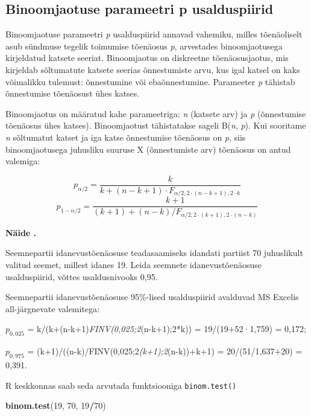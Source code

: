\documentclass[
]{book}
\newenvironment{Shaded}{\begin{snugshade}}{\end{snugshade}}
\newcommand{\DecValTok}[1]{\textcolor[rgb]{0.00,0.00,0.81}{#1}}
\newcommand{\FunctionTok}[1]{\textcolor[rgb]{0.13,0.29,0.53}{\textbf{#1}}}
\newcommand{\NormalTok}[1]{#1}
\newcommand{\SpecialCharTok}[1]{\textcolor[rgb]{0.81,0.36,0.00}{\textbf{#1}}}
\newcounter{naidis}[chapter]
\newenvironment{naidis}
{%
\definecolor{shadecolor}{rgb}{200, 200, 0}
\par\parindent 0pt
\begin{framed}
\begin{naitefont}
\refstepcounter{naidis}\textbf{Näide \thenaidis.}
}
{%
\end{naitefont}%
\end{framed}
}%
\renewenvironment{Shaded} {\begin{snugshade}\footnotesize} {\end{snugshade}}
\theoremstyle{definition}
\theoremstyle{definition}
\theoremstyle{definition}
\theoremstyle{definition}
\theoremstyle{remark}
\begin{document}
\subsection{Binoomjaotuse parameetri p usalduspiirid}\label{binoomjaotuse-parameetri-p-usalduspiirid}

Binoomjaotuse parameetri \emph{p} usalduspiirid annavad vahemiku, milles tõenäoliselt asub sündmuse tegelik toimumise tõenäosus \emph{p}, arvestades binoomjaotusega kirjeldatud katsete seeriat. Binoomjaotus on diskreetne tõenäosusjaotus, mis kirjeldab sõltumatute katsete seerias õnnestumiste arvu, kus igal katsel on kaks võimalikku tulemust: õnnestumine või ebaõnnestumine. Parameeter \emph{p} tähistab õnnestumise tõenäosust ühes katses.

Binoomjaotus on määratud kahe parameetriga: \emph{n} (katsete arv) ja \emph{p} (õnnestumise tõenäosus ühes katses). Binoomjaotust tähistatakse sageli B(\emph{n}, \emph{p}). Kui sooritame \emph{n} sõltumatut katset ja iga katse õnnestumise tõenäosus on \emph{p}, siis binoomjaotusega juhusliku suuruse X (õnnestumiste arv) tõenäosus on antud valemiga:

\[p_{\alpha/2} = \frac{k}{k + (n-k + 1) \cdot F_{\alpha/2,2 \cdot (n-k+1), 2\cdot k}}\]
\[p_{1- \alpha/2} = \frac{k+1}{(k+1)+(n-k) / F_{\alpha/2,2\cdot (k+1), 2 \cdot (n-k)}}\]

\begin{naidis}
Seemnepartii idanevustõenäosuse teadasaamiseks idandati partiist 70 juhuslikult valitud seemet, millest idanes 19. Leida seemnete idanevustõenäosuse usalduspiirid, võttes usaldusnivooks 0,95.
\end{naidis}

Seemnepartii idanevustõenäosuse 95\%-lised usalduspiirid avalduvad MS Excelis all-järgnevate valemitega:

\(p_{0,025}\) = k/(k+(n-k+1)\emph{FINV(0,025;2}(n-k+1);2*k)) = 19/(19+52·1,759) = 0,172;

\(p_{0,975}\) = (k+1)/((n-k)/FINV(0,025;2\emph{(k+1);2}(n-k))+k+1) = 20/(51/1,637+20) = 0,391.

R keskkonnas saab seda arvutada funktsiooniga \texttt{binom.test()}

\begin{Shaded}
\begin{Highlighting}[]
\FunctionTok{binom.test}\NormalTok{(}\DecValTok{19}\NormalTok{, }\DecValTok{70}\NormalTok{, }\DecValTok{19}\SpecialCharTok{/}\DecValTok{70}\NormalTok{)}
\end{Highlighting}
\end{Shaded}
\end{document}
